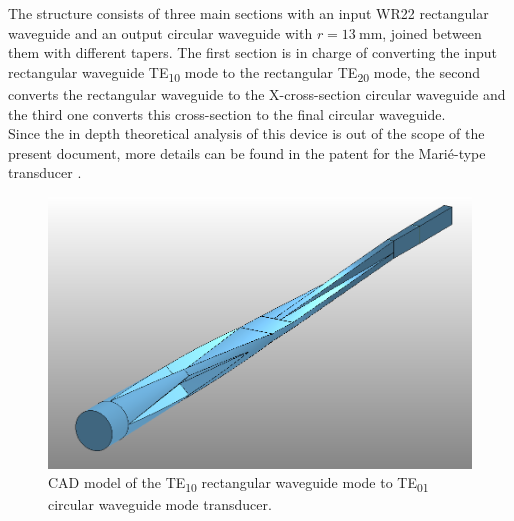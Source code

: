 \documentclass[english,twoside]{article}
\begin{document}
    The structure consists of three main sections with an input \ac{WR}22 rectangular waveguide and an output circular waveguide with $r=\SI{13}{\milli\metre}$, joined between them with different tapers. The first section is in charge of converting the input rectangular waveguide \ac{TE}\textsubscript{10} mode to the rectangular \ac{TE}\textsubscript{20} mode, the second converts the rectangular waveguide to the X-cross-section circular waveguide and the third one converts this cross-section to the final circular waveguide.\\
    
    Since the in depth theoretical analysis of this device is out of the scope of the present document, more details can be found in the patent for the Marié-type transducer \cite{marie}.\\
    
    \begin{figure}
	      \centering
	      \includegraphics[width=.7\textwidth]{figures/marie_structure}
	      \caption{CAD model of the TE\textsubscript{10} rectangular waveguide mode to TE\textsubscript{01} circular waveguide mode transducer.}
	      \label{fig:marie_cad}
    \end{figure}
    
\end{document}
